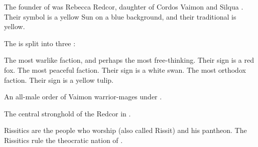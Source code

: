\begin{gloss}
\begin{subgloss}
  The founder of \ClanRedcor was Rebecca Redcor, daughter of Cordos Vaimon and Silqua \Delaen. 
  Their symbol is a yellow Sun on a blue background, and their traditional \colour is yellow. 
  
  The \vclan is split into three \RedcorHouses: 
  
  \begin{subgloss}
    \gitem{\TheFoxFaction} 
    \index{\FoxFaction} 
      The most warlike faction, and perhaps the most free-thinking. 
      Their sign is a red fox. 
    \gitem{\TheSwanFaction} 
    \index{\SwanFaction} 
      The most peaceful faction. 
      Their sign is a white swan. 
    \gitem{\TheTulipFaction} 
    \index{\TulipFaction} 
      The most orthodox faction. 
      Their sign is a yellow tulip.
  \end{subgloss}
  
  
  
  
  
  \begin{comment}
  \subparagraph{\gandierre}
  \end{comment}
  \gitem[\gandierres]{\gandierre}
  An all-male order of Vaimon warrior-mages under \ClanRedcor. 
  
  
  
  
  
  
  
  
  
  
  \begin{comment}
  \subparagraph{\TopazChateau}
  \end{comment}
  \gitem{\TopazChateau}
  The central stronghold of the Redcor in \Redce. 
\end{subgloss}








\begin{comment}
\paragraph{Rissitics}
\end{comment}
Rissitics are the people who worship \HriistN{} (also called Rissit) and his pantheon. 
The Rissitics rule the theocratic nation of . 


\end{gloss}
